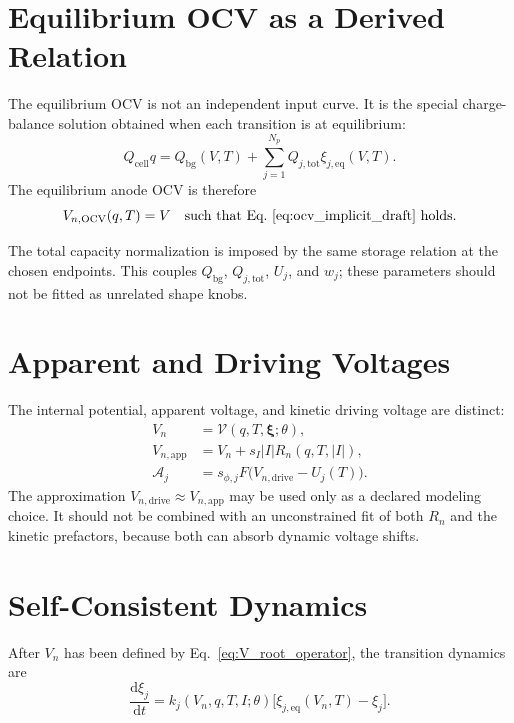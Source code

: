 \documentclass[11pt,a4paper]{article}
\newcommand{\dd}{\mathrm{d}}
\newcommand{\OCV}{\mathrm{OCV}}
\newcommand{\app}{\mathrm{app}}
\newcommand{\drive}{\mathrm{drive}}
\newcommand{\bg}{\mathrm{bg}}
\newcommand{\cell}{\mathrm{cell}}
\newcommand{\tot}{\mathrm{tot}}
\newcommand{\eq}{\mathrm{eq}}
\begin{document}
\section{Equilibrium OCV as a Derived Relation}

The equilibrium OCV is not an independent input curve.  It is the special
charge-balance solution obtained when each transition is at equilibrium:
\begin{equation}
Q_{\cell}q
=
Q_{\bg}(V,T)
+\sum_{j=1}^{N_p}Q_{j,\tot}\xi_{j,\eq}(V,T).
\label{eq:ocv_implicit_draft}
\end{equation}
The equilibrium anode OCV is therefore
\begin{equation}
V_{n,\OCV}(q,T)=V
\quad\text{such that Eq.~\eqref{eq:ocv_implicit_draft} holds.}
\label{eq:ocv_root_definition}
\end{equation}

The total capacity normalization is imposed by the same storage relation at the
chosen endpoints.  This couples \(Q_{\bg}\), \(Q_{j,\tot}\), \(U_j\), and
\(w_j\); these parameters should not be fitted as unrelated shape knobs.

\section{Apparent and Driving Voltages}

The internal potential, apparent voltage, and kinetic driving voltage are
distinct:
\begin{align}
V_n &=
\mathcal V(q,T,\bm{\xi};\theta),\\
V_{n,\app} &=
V_n+s_I |I|R_n(q,T,|I|),\label{eq:Vapp_draft}\\
\mathcal A_j &=
s_{\phi,j}F\bigl(V_{n,\drive}-U_j(T)\bigr).
\label{eq:affinity_draft}
\end{align}
The approximation \(V_{n,\drive}\approx V_{n,\app}\) may be used only as a
declared modeling choice.  It should not be combined with an unconstrained
fit of both \(R_n\) and the kinetic prefactors, because both can absorb dynamic
voltage shifts.

\section{Self-Consistent Dynamics}

After \(V_n\) has been defined by Eq.~\eqref{eq:V_root_operator}, the transition
dynamics are
\begin{equation}
\frac{\dd \xi_j}{\dd t}
=
k_j(V_n,q,T,I;\theta)
\bigl[\xi_{j,\eq}(V_n,T)-\xi_j\bigr].
\label{eq:dxidt_draft}
\end{equation}
\end{document}
